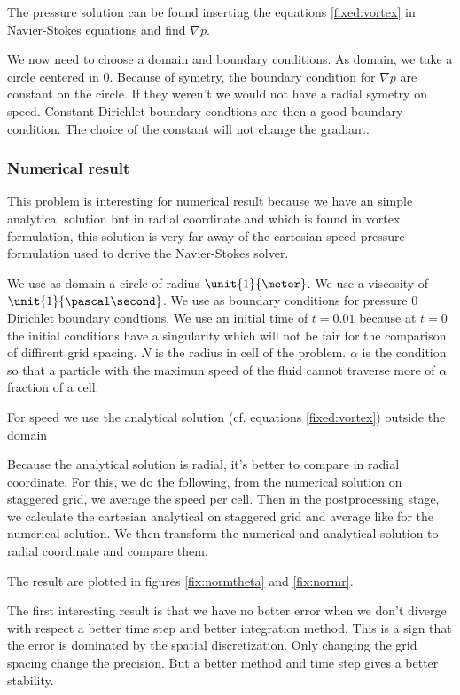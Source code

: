 The pressure solution can be found inserting the equations \ref{fixed:vortex} in Navier-Stokes equations and find $\nabla p$.

We now need to choose a domain and boundary conditions.
As domain, we take a circle centered in $0$. Because of symetry, the boundary condition for $\nabla p$ are constant on the circle.
If they weren't we would not have a radial symetry on speed.
Constant Dirichlet boundary condtions are then a good boundary condition.
The choice of the constant will not change the gradiant.

\subsubsection{Numerical result}

This problem is interesting for numerical result because we have an simple analytical solution but in radial coordinate and
which is found in vortex formulation, this solution is very far away of the cartesian speed pressure formulation used to
derive the Navier-Stokes solver.

We use as domain a circle of radius $\unit{1}{\meter}$. We use a viscosity of $\unit{1}{\pascal\second}$.
We use as boundary conditions for pressure $0$ Dirichlet boundary condtions.
We use an initial time of $t=0.01$ because at $t=0$ the initial conditions have a singularity which will not be fair for the 
comparison of diffirent grid spacing.
$N$ is the radius in cell of the problem.
$\alpha$ is the condition so that a particle with the maximun speed of the fluid cannot traverse
more of $\alpha$ fraction of a cell.

For speed we use the analytical solution (cf. equations \ref{fixed:vortex}) outside the domain

Because the analytical solution is radial, it's better to compare in radial coordinate.
For this, we do the following, from the numerical solution on staggered grid,
we average the speed per cell. Then in the postprocessing stage, we calculate the cartesian analytical on staggered grid and
average like for the numerical solution. We then transform the numerical and analytical solution to radial coordinate and compare them.

The result are plotted in figures \ref{fix:normtheta} and \ref{fix:normr}.

The first interesting result is that we have no better error when we don't diverge with respect a better time step and better integration method.
This is a sign that the error is dominated by the spatial discretization.
Only changing the grid spacing change the precision.
But a better method and time step gives a better stability.

